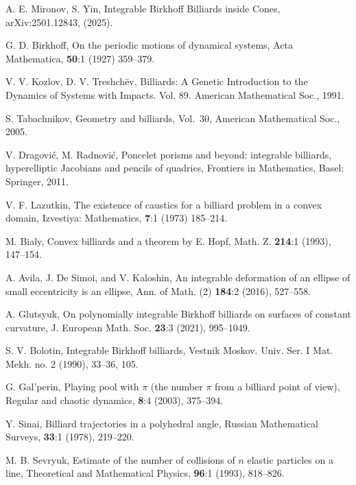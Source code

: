 \documentclass[12pt]{article}
\begin{document}
\begin{thebibliography}{1}

A. E. Mironov, S. Yin, Integrable Birkhoff Billiards inside Cones, 
arXiv:2501.12843, (2025).

G. D. Birkhoff, On the periodic motions of dynamical systems, 
Acta Mathematica, {\bf 50}:1 (1927) 359--379.

V. V. Kozlov, D. V. Treshch\"ev, Billiards: 
A Genetic Introduction to the Dynamics of Systems with Impacts. Vol. 89. American Mathematical Soc., 1991.

S. Tabachnikov, Geometry and billiards, 
Vol.~30, American Mathematical Soc., 2005.

V. Dragovi\'c, M. Radnovi\'c, Poncelet porisms and beyond: integrable billiards, 
hyperelliptic Jacobians and pencils of quadrics, Frontiers in Mathematics, Basel: Springer, 2011.

V. F. Lazutkin, The existence of caustics for a billiard problem in a convex domain, 
Izvestiya: Mathematics, {\bf 7}:1 (1973) 185--214.
	
M. Bialy, Convex billiards and a theorem by E. Hopf, 
Math. Z. {\bf 214}:1 (1993), 147--154.
	
A. Avila, J. De Simoi, and V. Kaloshin, An integrable deformation of an ellipse of small eccentricity is an ellipse, 
Ann. of Math. (2) {\bf 184}:2 (2016), 527--558.
	

A. Glutsyuk, On polynomially integrable Birkhoff billiards on surfaces of constant curvature, 
J. European Math. Soc. {\bf 23}:3 (2021), 995--1049.

S. V. Bolotin, Integrable Birkhoff billiards, 
Vestnik Moskov. Univ. Ser. I Mat. Mekh. no. 2 (1990), 33--36, 105.


 G. Gal'perin, Playing pool with $\pi$ (the number $\pi$ from a billiard point of view), 
Regular and chaotic dynamics, {\bf 8}:4 (2003), 375--394.

Y. Sinai, Billiard trajectories in a polyhedral angle, 
Russian Mathematical Surveys, {\bf 33}:1 (1978), 219--220.

M. B. Sevryuk, Estimate of the number of collisions of $n$ elastic particles on a line, 
Theoretical and Mathematical Physics, {\bf 96}:1 (1993), 818--826.



\end{thebibliography}
\end{document}
